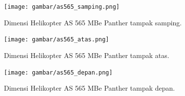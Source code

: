 \begin{figure}[H]
	\centering
	\texttt{[image: gambar/as565\_samping.png]}
	\caption{Dimensi Helikopter AS 565 MBe Panther tampak samping.}
	\label{fig:as565mbe_samping}
\end{figure}

\begin{figure}[H]
	\centering
	\texttt{[image: gambar/as565\_atas.png]}
	\caption{Dimensi Helikopter AS 565 MBe Panther tampak atas.}
	\label{fig:as565mbe_atas}
\end{figure}

\begin{figure}[H]
	\centering
	\texttt{[image: gambar/as565\_depan.png]}
	\caption{Dimensi Helikopter AS 565 MBe Panther tampak depan.}
	\label{fig:as565mbe_depan}
\end{figure}